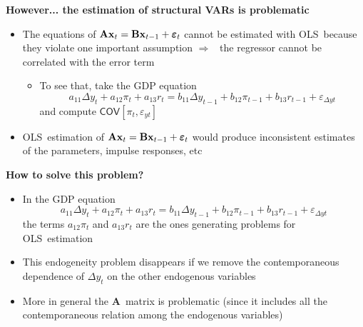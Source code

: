 \documentclass[10pt,handout]{beamer}
\begin{document}
\vspace{0.1cm}

\begin{frame}
{\textbf{However... the estimation of structural VARs is problematic}}

\begin{itemize}
\item The equations of $\mathbf{Ax}_{t}=\mathbf{Bx}_{t-1}+\mathbf{%
\varepsilon }_{t}$ cannot be estimated with OLS\ because they violate one
important assumption $\Longrightarrow $\ {{\color{red} the regressor cannot
be correlated with the error term}}\medskip \pause

\begin{itemize}
\item To see that, take the GDP equation%
\begin{equation*}
a_{11}\Delta y_{t}+a_{12}\pi _{t}+a_{13}r_{t}=b_{11}\Delta y_{t-1}+b_{12}\pi
_{t-1}+b_{13}r_{t-1}+\varepsilon _{\Delta yt}
\end{equation*}%
and compute $\mathsf{COV}[\pi _{t},\varepsilon _{yt}]$\medskip \pause
\end{itemize}

\item OLS\ estimation of $\mathbf{Ax}_{t}=\mathbf{Bx}_{t-1}+\mathbf{%
\varepsilon }_{t}$ would produce inconsistent estimates of the parameters,
impulse responses, etc
\end{itemize}
\end{frame}

\vspace{0.1cm}

\begin{frame}
{\textbf{How to solve this problem?}}

\begin{itemize}
\item In the GDP equation%
\begin{equation*}
a_{11}\Delta y_{t}+a_{12}\pi _{t}+a_{13}r_{t}=b_{11}\Delta y_{t-1}+b_{12}\pi
_{t-1}+b_{13}r_{t-1}+\varepsilon _{\Delta yt}
\end{equation*}%
the terms $a_{12}\pi _{t}$ and $a_{13}r_{t}$ are the ones generating
problems for OLS\ estimation\medskip \pause

\item This endogeneity problem disappears if we remove the contemporaneous
dependence of $\Delta y_{t}$ on the other endogenous variables\medskip 
\pause

\item More in general the $\mathbf{A}$\ matrix is problematic (since it
includes all the contemporaneous relation among the endogenous variables)
\end{itemize}
\end{frame}
\end{document}
